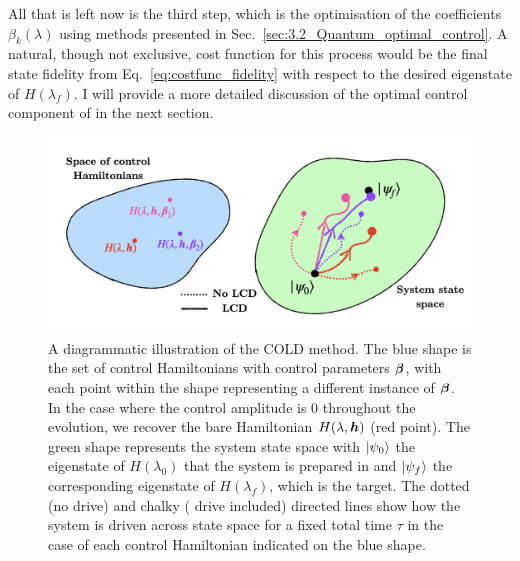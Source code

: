 All that is left now is the third  step, which is the optimisation of the coefficients $\beta_k(\lambda)$ using  methods presented in Sec.~\ref{sec:3.2_Quantum_optimal_control}. A natural, though not exclusive, cost function for this process would be the final state fidelity from Eq.~\eqref{eq:costfunc_fidelity} with respect to the desired eigenstate of $H(\lambda_f)$. I will provide a more detailed discussion of the optimal control component of  in the next section.

\begin{figure}[t]
    \centering
    \includegraphics[width=0.8\linewidth]{images_v1/COLD_illustration.png} \caption[A diagrammatic illustration of the COLD method]{A diagrammatic illustration of the COLD method. The blue shape is the set of control Hamiltonians with control parameters $\boldsymbol{\beta}$, with each point within the shape representing a different instance of $\boldsymbol{\beta}$. In the case where the control amplitude is $0$ throughout the evolution, we recover the bare Hamiltonian $H(\lambda, \boldsymbol{h})$ (red point). The green shape represents the system state space with $\ket{\psi_0}$ the eigenstate of $H(\lambda_0)$ that the system is prepared in and $\ket{\psi_f}$ the corresponding eigenstate of $H(\lambda_f)$, which is the target. The dotted (no  drive) and chalky ( drive included) directed lines show how the system is driven across state space for a fixed total time $\tau$ in the case of each control Hamiltonian indicated on the blue shape.}\label{fig:COLD_illustration}
\end{figure}

